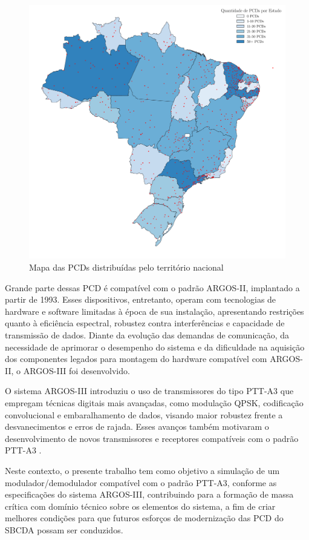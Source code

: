 \newpage
\begin{figure}[H]
	\centering
	\caption{Mapa das PCDs distribuídas pelo território nacional}\label{fig:pcd_nacional}
	\includegraphics[width=0.95\linewidth]{assets/cap1/geoplot.pdf}
\end{figure}


Grande parte dessas \gls{PCD} é compatível com o padrão \gls{ARGOS-II}, implantado a partir de 1993. Esses dispositivos, entretanto, operam com tecnologias de hardware e software limitadas à época de sua instalação, apresentando restrições quanto à eficiência espectral, robustez contra interferências e capacidade de transmissão de dados. Diante da evolução das demandas de comunicação, da necessidade de aprimorar o desempenho do sistema e da dificuldade na aquisição dos componentes legados para montagem do hardware compatível com \gls{ARGOS-II}, o \gls{ARGOS-III} foi desenvolvido.

O sistema \gls{ARGOS-III} introduziu o uso de transmissores do tipo \gls{PTT-A3} que empregam técnicas digitais mais avançadas, como modulação \gls{QPSK}, codificação convolucional e embaralhamento de dados, visando maior robustez frente a desvanecimentos e erros de rajada. Esses avanços também motivaram o desenvolvimento de novos transmissores e receptores compatíveis com o padrão \gls{PTT-A3} \cite{cnes_services_and_message_formats_ed2_rev2_2006}.

Neste contexto, o presente trabalho tem como objetivo a simulação de um modulador/demodulador compatível com o padrão \gls{PTT-A3}, conforme as especificações do sistema \gls{ARGOS-III}, contribuindo para a formação de massa crítica com domínio técnico sobre os elementos do sistema, a fim de criar melhores condições para que futuros esforços de modernização das \gls{PCD} do \gls{SBCDA} possam ser conduzidos. 


